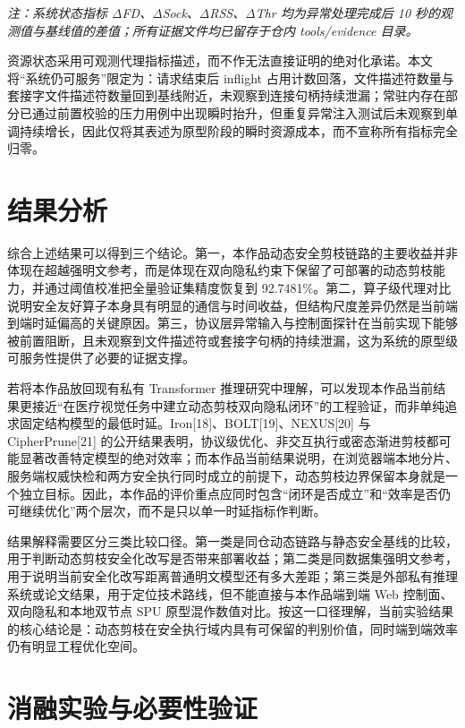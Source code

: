 \noindent\textit{注：系统状态指标 ΔFD、ΔSock、ΔRSS、ΔThr 均为异常处理完成后 10 秒的观测值与基线值的差值；所有证据文件均已留存于仓内 tools/evidence 目录。}


资源状态采用可观测代理指标描述，而不作无法直接证明的绝对化承诺。本文将“系统仍可服务”限定为：请求结束后 inflight 占用计数回落，文件描述符数量与套接字文件描述符数量回到基线附近，未观察到连接句柄持续泄漏；常驻内存在部分已通过前置校验的压力用例中出现瞬时抬升，但重复异常注入测试后未观察到单调持续增长，因此仅将其表述为原型阶段的瞬时资源成本，而不宣称所有指标完全归零。

\section{结果分析}

综合上述结果可以得到三个结论。第一，本作品动态安全剪枝链路的主要收益并非体现在超越强明文参考，而是体现在双向隐私约束下保留了可部署的动态剪枝能力，并通过阈值校准把全量验证集精度恢复到 92.7481\%。第二，算子级代理对比说明安全友好算子本身具有明显的通信与时间收益，但结构尺度差异仍然是当前端到端时延偏高的关键原因。第三，协议层异常输入与控制面探针在当前实现下能够被前置阻断，且未观察到文件描述符或套接字句柄的持续泄漏，这为系统的原型级可服务性提供了必要的证据支撑。

若将本作品放回现有私有 Transformer 推理研究中理解，可以发现本作品当前结果更接近“在医疗视觉任务中建立动态剪枝双向隐私闭环”的工程验证，而非单纯追求固定结构模型的最低时延。Iron[18]、BOLT[19]、NEXUS[20] 与 CipherPrune[21] 的公开结果表明，协议级优化、非交互执行或密态渐进剪枝都可能显著改善特定模型的绝对效率；而本作品当前结果说明，在浏览器端本地分片、服务端权威快检和两方安全执行同时成立的前提下，动态剪枝边界保留本身就是一个独立目标。因此，本作品的评价重点应同时包含“闭环是否成立”和“效率是否仍可继续优化”两个层次，而不是只以单一时延指标作判断。

结果解释需要区分三类比较口径。第一类是同仓动态链路与静态安全基线的比较，用于判断动态剪枝安全化改写是否带来部署收益；第二类是同数据集强明文参考，用于说明当前安全化改写距离普通明文模型还有多大差距；第三类是外部私有推理系统或论文结果，用于定位技术路线，但不能直接与本作品端到端 Web 控制面、双向隐私和本地双节点 SPU 原型混作数值对比。按这一口径理解，当前实验结果的核心结论是：动态剪枝在安全执行域内具有可保留的判别价值，同时端到端效率仍有明显工程优化空间。

\section{消融实验与必要性验证}

